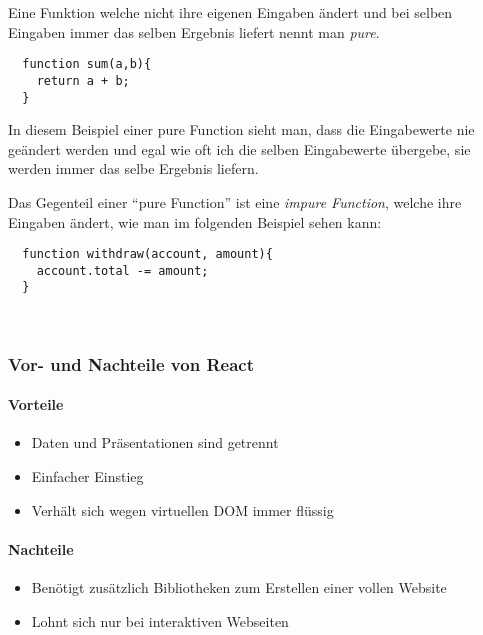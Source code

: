  Eine Funktion welche nicht ihre eigenen Eingaben ändert und bei selben Eingaben immer das selben 
 Ergebnis liefert nennt man \textit{pure}.
\begin{lstlisting}
  function sum(a,b){
    return a + b;
  }
\end{lstlisting}
In diesem Beispiel einer pure Function sieht man, dass die Eingabewerte nie geändert werden und egal 
wie oft ich die selben Eingabewerte übergebe, sie werden immer das selbe Ergebnis liefern.


Das Gegenteil einer ``pure Function'' ist eine \textit{impure Function}, welche ihre Eingaben ändert, 
wie man im folgenden Beispiel sehen kann:
\begin{lstlisting}
  function withdraw(account, amount){
    account.total -= amount;
  }
\end{lstlisting}
~\cite{Props}
\subsubsection{Vor- und Nachteile von React}
\paragraph{Vorteile}
\begin{itemize}
	\item Daten und Präsentationen sind getrennt
	\item Einfacher Einstieg
	\item Verhält sich wegen virtuellen DOM immer flüssig
\end{itemize}
\paragraph{Nachteile}
\begin{itemize}
	\item Benötigt zusätzlich Bibliotheken zum Erstellen einer vollen Website
	\item Lohnt sich nur bei interaktiven Webseiten
\end{itemize}~\cite{ReactVor-undNachteile}

